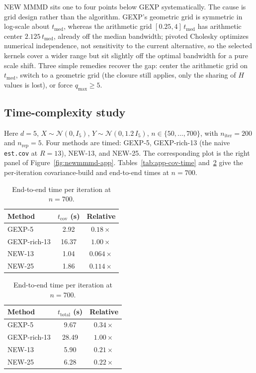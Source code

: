 \documentclass[12pt]{article}
\begin{document}
NEW MMMD sits one to four points below GEXP systematically. The cause is grid design rather than the algorithm. GEXP's geometric grid is symmetric in log-scale about $t_{\mathrm{med}}$, whereas the arithmetic grid $[0.25,4]\,t_{\mathrm{med}}$ has arithmetic center $2.125\,t_{\mathrm{med}}$, already off the median bandwidth; pivoted Cholesky optimizes numerical independence, not sensitivity to the current alternative, so the selected kernels cover a wider range but sit slightly off the optimal bandwidth for a pure scale shift. Three simple remedies recover the gap: center the arithmetic grid on $t_{\mathrm{med}}$, switch to a geometric grid (the closure still applies, only the sharing of $H$ values is lost), or force $q_{\max}\ge 5$.

\subsection{Time-complexity study}

Here $d=5$, $X\sim\mathcal{N}(0,I_5)$, $Y\sim\mathcal{N}(0,1.2\,I_5)$, $n\in\{50,\dots,700\}$, with $n_{\mathrm{iter}}=200$ and $n_{\mathrm{rep}}=5$. Four methods are timed: GEXP-5, GEXP-rich-13 (the naive \texttt{est.cov} at $R=13$), NEW-13, and NEW-25. The corresponding plot is the right panel of Figure~\ref{fig:newmmmd-app}. Tables~\ref{tab:app-cov-time} and~\ref{tab:app-total-time} give the per-iteration covariance-build and end-to-end times at $n=700$.

\begin{table}[H]
\centering
\begin{minipage}[t]{0.48\textwidth}
\centering
\caption{Covariance-build time per iteration at $n=700$.}
\label{tab:app-cov-time}
\scriptsize
\begin{tabular}{lcc}
\toprule
Method & $t_{\mathrm{cov}}$ (s) & Relative \\
\midrule
GEXP-5       & 2.92  & $0.18\times$ \\
GEXP-rich-13 & 16.37 & $1.00\times$ \\
NEW-13       & 1.04  & $0.064\times$ \\
NEW-25       & 1.86  & $0.114\times$ \\
\bottomrule
\end{tabular}
\end{minipage}\hfill
\begin{minipage}[t]{0.48\textwidth}
\centering
\caption{End-to-end time per iteration at $n=700$.}
\label{tab:app-total-time}
\scriptsize
\begin{tabular}{lcc}
\toprule
Method & $t_{\mathrm{total}}$ (s) & Relative \\
\midrule
GEXP-5       & 9.67  & $0.34\times$ \\
GEXP-rich-13 & 28.49 & $1.00\times$ \\
NEW-13       & 5.90  & $0.21\times$ \\
NEW-25       & 6.28  & $0.22\times$ \\
\bottomrule
\end{tabular}
\end{minipage}
\end{table}
\end{document}
